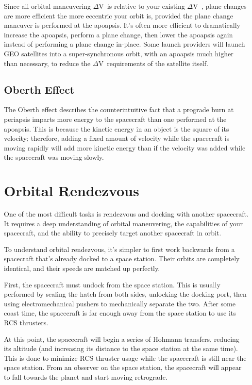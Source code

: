 \documentclass[oneside,a5paper]{book}
\newcommand{\dv}{$\Delta$\hspace{-0.2ex}V}
\newcommand{\afterchapter}{\vspace{1em}}
\begin{document}
Since all orbital maneuvering \dv\ is relative to your existing \dv\ ,
plane changes are more efficient the more eccentric your orbit is,
provided the plane change maneuver is performed at the apoapsis. It’s
often more efficient to dramatically increase the apoapsis, perform a
plane change, then lower the apoapsis again instead of performing a
plane change in-place. Some launch providers will launch GEO
satellites into a super-synchronous orbit, with an apoapsis much
higher than necessary, to reduce the \dv\ requirements of the satellite
itself.

\subsection{Oberth Effect}

The Oberth effect describes the counterintuitive fact that a prograde
burn at periapsis imparts more energy to the spacecraft than one
performed at the apoapsis. This is because the kinetic energy in an
object is the square of its velocity; therefore, adding a fixed amount
of velocity while the spacecraft is moving rapidly will add more
kinetic energy than if the velocity was added while the spacecraft was
moving slowly.

\section{Orbital Rendezvous}

\afterchapter

One of the most difficult tasks is rendezvous and docking with another
spacecraft. It requires a deep understanding of orbital maneuvering,
the capabilities of your spacecraft, and the ability to precisely
target another spacecraft in orbit.

To understand orbital rendezvous, it’s simpler to first work backwards
from a spacecraft that’s already docked to a space station. Their
orbits are completely identical, and their speeds are matched up
perfectly.

First, the spacecraft must undock from the space station. This is
usually performed by sealing the hatch from both sides, unlocking the
docking port, then using electromechanical pushers to mechanically
separate the two. After some coast time, the spacecraft is far enough
away from the space station to use its RCS thrusters.

At this point, the spacecraft will begin a series of Hohmann
transfers, reducing its altitude (and increasing its distance to the
space station at the same time). This is done to minimize RCS thruster
usage while the spacecraft is still near the space station. From an
observer on the space station, the spacecraft will appear to fall
towards the planet and start moving retrograde.
\end{document}
